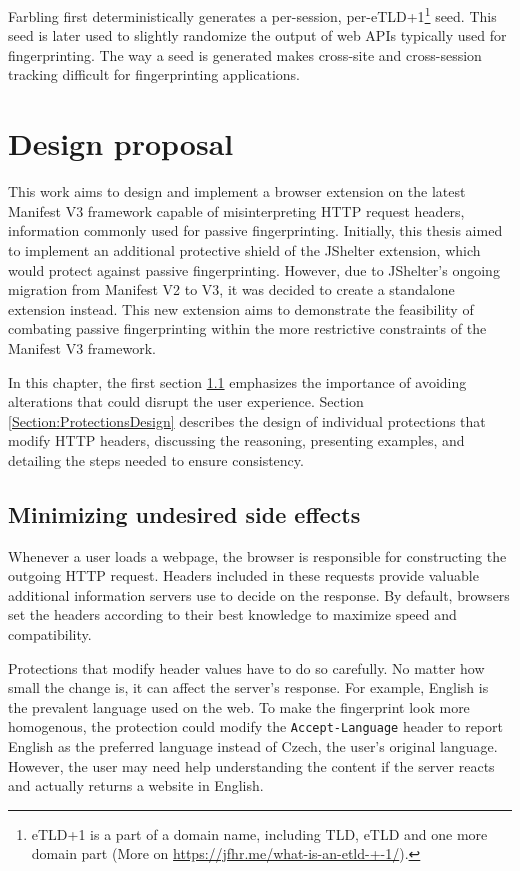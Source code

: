 Farbling first deterministically generates a per-session, per-eTLD+1\footnote{eTLD+1 is a part of a domain name, including TLD, eTLD and one more domain part (More on \url{https://jfhr.me/what-is-an-etld-+-1/}).} seed. This seed is later used to slightly randomize the output of web APIs typically used for fingerprinting. The way a seed is generated makes cross-site and cross-session tracking difficult for fingerprinting applications.


\chapter{Design proposal}
\label{Chapter:Design}

This work aims to design and implement a browser extension on the latest Manifest V3 framework capable of misinterpreting HTTP request headers, information commonly used for passive fingerprinting. Initially, this thesis aimed to implement an additional protective shield of the JShelter extension, which would protect against passive fingerprinting. However, due to JShelter's ongoing migration from Manifest V2 to V3, it was decided to create a standalone extension instead. This new extension aims to demonstrate the feasibility of combating passive fingerprinting within the more restrictive constraints of the Manifest V3 framework.

In this chapter, the first section \ref{Section:SideEffects} emphasizes the importance of avoiding alterations that could disrupt the user experience. Section \ref{Section:ProtectionsDesign} describes the design of individual protections that modify HTTP headers, discussing the reasoning, presenting examples, and detailing the steps needed to ensure consistency.

\section{Minimizing undesired side effects}
\label{Section:SideEffects}

Whenever a user loads a webpage, the browser is responsible for constructing the outgoing HTTP request. Headers included in these requests provide valuable additional information servers use to decide on the response. By default, browsers set the headers according to their best knowledge to maximize speed and compatibility.

Protections that modify header values have to do so carefully. No matter how small the change is, it can affect the server's response. For example, English is the prevalent language used on the web. To make the fingerprint look more homogenous, the protection could modify the \texttt{Accept-Language} header to report English as the preferred language instead of Czech, the user's original language. However, the user may need help understanding the content if the server reacts and actually returns a website in English.

